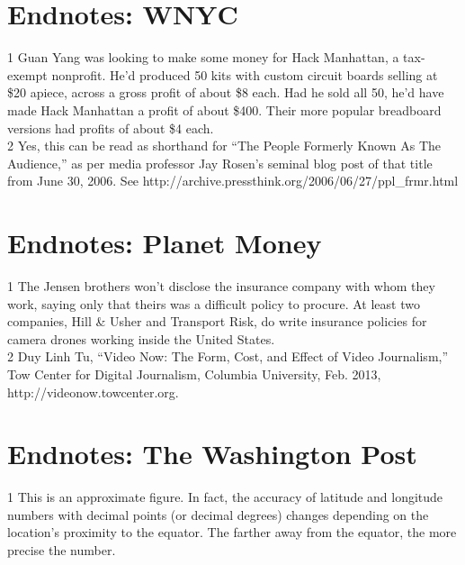 \begin{itemize}
\begin{itemized}
\begin{itemize}
\section{Endnotes: WNYC}
1 Guan Yang was looking to make some money for Hack Manhattan, a tax-exempt nonprofit. He'd
produced 50 kits with custom circuit boards selling at \$20 apiece, across a gross profit of about
\$8 each. Had he sold all 50, he'd have made Hack Manhattan a profit of about \$400. Their more
popular breadboard versions had profits of about \$4 each.\\
2 Yes, this can be read as shorthand for ``The People Formerly Known As The Audience,'' as per
media professor Jay Rosen's seminal blog post of that title from June 30, 2006. See http://archive.pressthink.org/2006/06/27/ppl_frmr.html\\

\section{Endnotes: Planet Money}
1 The Jensen brothers won't disclose the insurance company with whom they work, saying only that
theirs was a difficult policy to procure. At least two companies, Hill & Usher and Transport Risk,
do write insurance policies for camera drones working inside the United States.\\
2 Duy Linh Tu, ``Video Now: The Form, Cost, and Effect of Video Journalism,'' Tow Center for
Digital Journalism, Columbia University, Feb. 2013, http://videonow.towcenter.org.\\

\section{Endnotes: The Washington Post}
1 This is an approximate figure. In fact, the accuracy of latitude and longitude numbers with
decimal points (or decimal degrees) changes depending on the location's proximity to the equator.
The farther away from the equator, the more precise the number.\\


\end{itemize}
\end{itemized}
\end{itemize}
